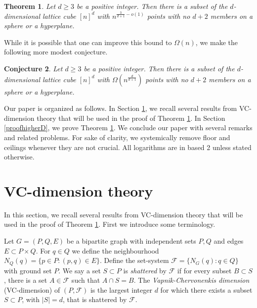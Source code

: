 \documentclass[11pt]{article}
\theoremstyle{plain}
\newtheorem{theorem}{Theorem}[section]
\newtheorem{conjecture}[theorem]{Conjecture}
\theoremstyle{definition}
\theoremstyle{remark}
\begin{document}
 


\begin{theorem}\label{higherD} Let $d \geq 3$ be a positive integer. Then there is a subset of the $d$-dimensional lattice cube $[n]^d$ with $n^{\frac{3}{d+1} -o(1)}$ points with no $d+2$ members on a sphere or a hyperplane.
\end{theorem}


While it is possible that one can improve this bound to $\Omega(n)$, we make the following more modest conjecture.

\begin{conjecture}\label{mainconj}
    Let $d \geq 3$ be a positive integer. Then there is a subset of the $d$-dimensional lattice cube $[n]^d$ with $\Omega(n^{\frac{d}{d + 1}})$ points with no $d+2$ members on a sphere or a hyperplane.
\end{conjecture}




Our paper is organized as follows.  In Section \ref{secvc}, we recall several results from VC-dimension theory that will be used in the proof of Theorem \ref{higherD}.  In Section \ref{proofhigherD}, we prove Theorem \ref{higherD}.   We conclude our paper with several remarks and related problems.  For sake of clarity, we systemically remove floor and ceilings whenever they are not crucial.  All logarithms are in based 2 unless stated otherwise.  

\section{VC-dimension theory}\label{secvc}
In this section, we recall several results from VC-dimension theory that will be used in the proof of Theorem \ref{higherD}.   First we introduce some terminology. 





Let $G = (P,Q,E)$ be a bipartite graph with independent sets $P,Q$ and edges $E \subset P \times Q$. For $q \in Q$ we define the neighbourhood $N_Q(q) = \{ p \in P \colon (p,q) \in E\}$. Define the set-system $\mathcal{F} = \{ N_G(q) \colon q \in Q\}$ with ground set $P$. We say a set $S \subset P$ is \emph{shattered} by $\mathcal{F}$ if for every subset $B \subset S$, there is a set $A \in \mathcal{F}$ such that $A \cap S = B$. The \emph{Vapnik-Chervonenkis dimension} (VC-dimension) of $(P,\mathcal{F})$ is the largest integer $d$ for which there exists a subset $S \subset P$, with $|S| = d$, that is shattered by $\mathcal{F}$. 
\end{document}
